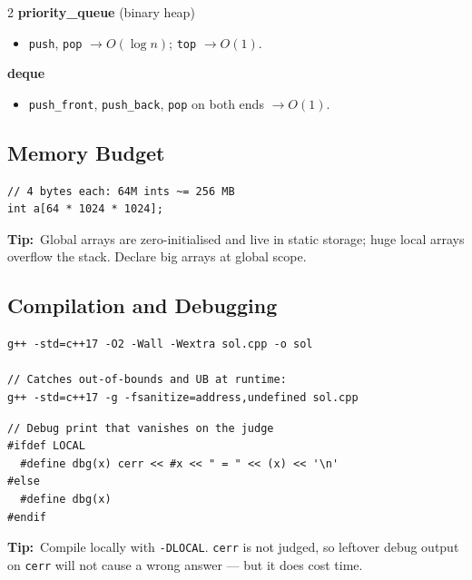 \documentclass[10pt]{article}
\newcommand{\code}[1]{\texttt{\small #1}}
\newcommand{\tip}[1]{{\color{tipc}\footnotesize\textbf{Tip:}}~{\footnotesize #1}\par}
\begin{document}
\begin{multicols}{2}
\textbf{priority\_queue} (binary heap)
\begin{itemize}
    \item \code{push}, \code{pop} $\rightarrow O(\log n)$;
          \code{top} $\rightarrow O(1)$.
\end{itemize}

\textbf{deque}
\begin{itemize}
    \item \code{push\_front}, \code{push\_back}, \code{pop} on both
          ends $\rightarrow O(1)$.
\end{itemize}

\subsection{Memory Budget}
\begin{lstlisting}
// 4 bytes each: 64M ints ~= 256 MB
int a[64 * 1024 * 1024];
\end{lstlisting}
\tip{Global arrays are zero-initialised and live in static storage;
huge local arrays overflow the stack. Declare big arrays at global scope.}

\subsection{Compilation and Debugging}
\begin{lstlisting}
g++ -std=c++17 -O2 -Wall -Wextra sol.cpp -o sol

// Catches out-of-bounds and UB at runtime:
g++ -std=c++17 -g -fsanitize=address,undefined sol.cpp
\end{lstlisting}

\begin{lstlisting}
// Debug print that vanishes on the judge
#ifdef LOCAL
  #define dbg(x) cerr << #x << " = " << (x) << '\n'
#else
  #define dbg(x)
#endif
\end{lstlisting}
\tip{Compile locally with \code{-DLOCAL}. \code{cerr} is not judged, so
leftover debug output on \code{cerr} will not cause a wrong answer ---
but it does cost time.}

\end{multicols}

\end{document}
